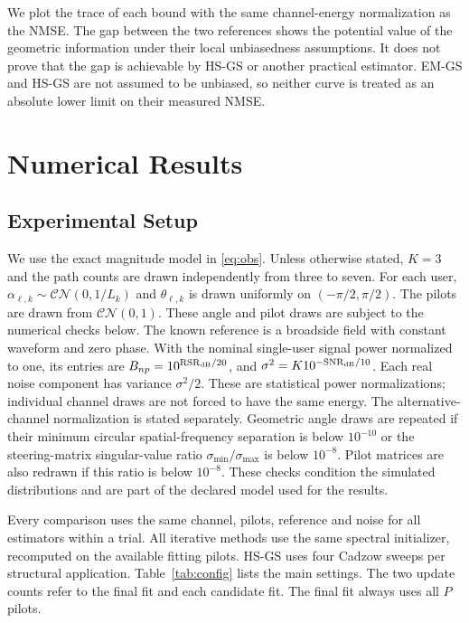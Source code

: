 \documentclass[journal]{IEEEtran}
\begin{document}
We plot the trace of each bound with the same channel-energy normalization
as the NMSE. The gap between the two references shows the potential value
of the geometric information under their local unbiasedness assumptions.
It does not prove that the gap is achievable by HS-GS or another practical
estimator. EM-GS and HS-GS are not assumed to be unbiased, so neither curve
is treated as an absolute lower limit on their measured NMSE.

\section{Numerical Results}
\label{sec:results}

\subsection{Experimental Setup}

We use the exact magnitude model in \eqref{eq:obs}. Unless otherwise
stated, $K=3$ and the path counts are drawn independently from three to
seven. For each user, $\alpha_{\ell,k}\sim\mathcal{CN}(0,1/L_k)$ and
$\theta_{\ell,k}$ is drawn uniformly on $(-\pi/2,\pi/2)$. The pilots
are drawn from $\mathcal{CN}(0,1)$. These angle and pilot draws are subject
to the numerical checks below. The known reference is a
broadside field with constant waveform and zero phase. With the nominal
single-user signal power normalized to one, its entries are
$B_{np}=10^{\mathrm{RSR}_{\rm dB}/20}$, and
$\sigma^2=K10^{-\mathrm{SNR}_{\rm dB}/10}$.
Each real noise component has variance $\sigma^2/2$. These are statistical
power normalizations; individual channel draws are not forced to have the
same energy. The alternative-channel normalization is stated separately.
Geometric angle draws are repeated if their minimum circular
spatial-frequency separation is below $10^{-10}$ or the steering-matrix
singular-value ratio $\sigma_{\min}/\sigma_{\max}$ is below $10^{-8}$.
Pilot matrices are also redrawn if this ratio is below $10^{-8}$.
These checks condition the simulated distributions and are part of the
declared model used for the results.

Every comparison uses the same channel, pilots, reference and noise for
all estimators within a trial. All iterative methods use the same spectral
initializer, recomputed on the available fitting pilots. HS-GS uses four
Cadzow sweeps per structural application. Table~\ref{tab:config} lists the
main settings. The two update counts refer to the final fit and each
candidate fit. The final fit always uses all $P$ pilots.
\end{document}
